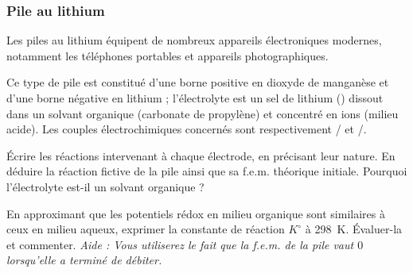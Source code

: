 \subsubsection{Pile au lithium}

\setcounter{equation}{0}
\setcounter{Q}{0}

Les piles au lithium équipent de nombreux appareils électroniques modernes, notamment les téléphones portables et appareils photographiques.

Ce type de pile est constitué d'une borne positive en dioxyde de manganèse  et d'une borne négative en lithium ; l'électrolyte est un sel de lithium () dissout dans un solvant organique (carbonate de propylène) et concentré en ions  (milieu acide). Les couples électrochimiques concernés sont respectivement / et /.

\Q \'{E}crire les réactions intervenant à chaque électrode, en précisant leur nature. En déduire la réaction fictive de la pile ainsi que sa f.e.m. théorique initiale. Pourquoi l’électrolyte est-il un solvant organique ?


\Q En approximant que les potentiels rédox en milieu organique sont similaires à ceux en milieu aqueux, exprimer la constante de réaction $K^\circ$ à \SI{298}{\kelvin}. \'{E}valuer-la et commenter. \emph{Aide : Vous utiliserez le fait que la f.e.m. de la pile vaut $0$ lorsqu'elle a terminé de débiter.}

